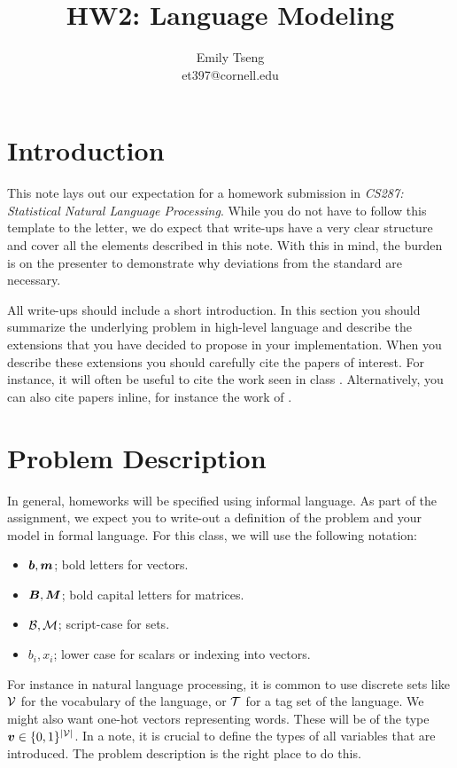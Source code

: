 \documentclass[11pt]{article}
\title{HW2: Language Modeling}
\author{Emily Tseng \\ et397@cornell.edu}
\begin{document}
\maketitle{}
\section{Introduction}

This note lays out our expectation for a homework submission in
\textit{CS287: Statistical Natural Language Processing}. While you do
not have to follow this template to the letter, we do expect that
write-ups have a very clear structure and cover all the elements
described in this note. With this in mind, the burden is on the
presenter to demonstrate why deviations from the standard are
necessary.

All write-ups should include a short introduction. In this section you
should summarize the underlying problem in high-level language and
describe the extensions that you have decided to propose in your
implementation. When you describe these extensions you should
carefully cite the papers of interest. For instance, it will often be
useful to cite the work seen in class
\citep{murphy2012machine}. Alternatively, you can also cite papers
inline, for instance the work of \citet{berger1996maximum}.


\section{Problem Description}

In general, homeworks will be specified using informal
language. As part of the assignment, we expect you to write-out a
definition of the problem and your model in formal language. For this
class, we will use the following notation:

\begin{itemize}
\item $\boldsymbol{b}, \boldsymbol{m}$;  bold letters for vectors.
\item $\boldsymbol{B}, \boldsymbol{M}$;  bold capital letters for matrices.
\item $\mathcal{B}, \mathcal{M}$;  script-case for sets.
\item $b_i, x_i$; lower case for scalars or indexing into vectors.
\end{itemize}


For instance in natural language processing, it is common to use
discrete sets like $\mathcal{V}$ for the vocabulary of the language, or $\mathcal{T}$ for a
tag set of the language.  We might also want one-hot vectors
representing words. These will be of the type
$\boldsymbol{v} \in \{0,1\}^{|\mathcal{V}|}$. In a note, it is crucial to define the
types of all variables that are introduced. The problem description is the
right place to do this.
\end{document}
